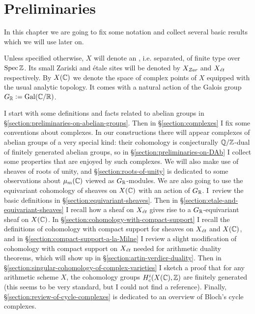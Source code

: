 \setcounter{chapter}{-1}
\chapter{Preliminaries}
\label{chapter:preliminaries}

In this chapter we are going to fix some notation and collect several basic
results which we will use later on.

\vspace{1em}

Unless specified otherwise, $X$ will denote an ,
i.e. separated, of finite type over $\operatorname{Spec} \mathbb{Z}$. Its small Zariski and étale
sites will be denoted by $X_\text{\it Zar}$ and $X_\text{\it ét}$
respectively. By $X (\mathbb{C})$ we denote the space of complex points of $X$ equipped
with the usual analytic topology. It comes with a natural action of the Galois
group $G_{\mathbb{R}} \mathrel{\mathop:}= \operatorname{Gal} (\mathbb{C}/\mathbb{R})$.

\vspace{1em}

I start with some definitions and facts related to abelian groups in
\S\ref{section:preliminaries-on-abelian-groups}.
Then in \S\ref{section:complexes} I fix some conventions about complexes.
In our constructions there will appear complexes of abelian groups of a very
special kind: their cohomology is conjecturally $\mathbb{Q}/\mathbb{Z}$-dual of finitely
generated abelian groups, so in \S\ref{section:preliminaries-on-DAb} I collect
some properties that are enjoyed by such complexes. We will also make use of
sheaves of roots of unity, and \S\ref{section:roots-of-unity} is dedicated to
some observations about $\mu_m (\mathbb{C})$ viewed as $G_{\mathbb{R}}$-modules. We are also
going to use the equivariant cohomology of sheaves on $X (\mathbb{C})$ with an action
of $G_{\mathbb{R}}$. I~review the basic definitions in
\S\ref{section:equivariant-sheaves}.
Then in \S\ref{section:etale-and-equivariant-sheaves} I recall how a sheaf on
$X_\text{\it ét}$ gives rise to a $G_{\mathbb{R}}$-equivariant sheaf on $X (\mathbb{C})$.
In \S\ref{section:cohomology-with-compact-support} I recall the definitions of
cohomology with compact support for sheaves on $X_\text{\it ét}$ and $X (\mathbb{C})$,
and in \S\ref{section:compact-support-a-la-Milne} I review a slight modification
of cohomology with compact support on $X_\text{\it ét}$ needed for arithmetic
duality theorems, which will show up in
\S\ref{section:artin-verdier-duality}. Then in
\S\ref{section:singular-cohomology-of-complex-varieties} I sketch a proof that
for any arithmetic scheme $X$, the cohomology groups $H^i_c (X (\mathbb{C}), \mathbb{Z})$ are
finitely generated (this seems to be very standard, but I could not find a
reference). Finally, \S\ref{section:review-of-cycle-complexes} is dedicated to
an overview of Bloch's cycle complexes.

